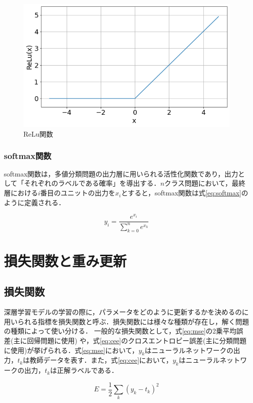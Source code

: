 \documentclass[a4j, 11pt]{jreport}
\begin{document}
\begin{figure}[H]
  \centering
  \includegraphics[width=0.7\hsize, keepaspectratio]{images/relu.png}
  \caption{ReLu関数}
  \label{fig:relu}
 \end{figure}

\subsubsection{softmax関数}
softmax関数は，多値分類問題の出力層に用いられる活性化関数であり，出力として「それぞれのラベルである確率」を導出する．$n$クラス問題において，最終層における$i$番目のユニットの出力を$x_{i}$とすると，softmax関数は式\ref{eq:softmax}のように定義される．

\begin{equation}
 y_{i} = \frac{e^{x_{i}}}{\sum_{k=0}^{n}e^{x_{k}}}
 \label{eq:softmax}
\end{equation}

\section{損失関数と重み更新}
\subsection{損失関数}
深層学習モデルの学習の際に，パラメータをどのように更新するかを決めるのに用いられる指標を損失関数と呼ぶ．損失関数には様々な種類が存在し，解く問題の種類によって使い分ける．
一般的な損失関数として，式\ref{eq:mse}の2乗平均誤差(主に回帰問題に使用) や，式\ref{eq:cee}のクロスエントロピー誤差(主に分類問題に使用)が挙げられる．式\ref{eq:mse}において，$y_{k}$はニューラルネットワークの出力，$t_{k}$は教師データを表す．また，式\ref{eq:cee}において，$y_{k}$はニューラルネットワークの出力，$t_{k}$は正解ラベルである．

\begin{equation}
	E = \frac{1}{2} \sum_{k} ({y_k} - t_k)^2
	\label{eq:mse}
\end{equation}
\end{document}
